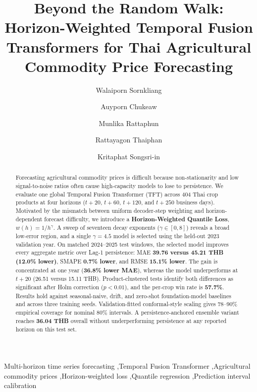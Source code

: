 \documentclass[review,3p,times]{elsarticle}
\begin{document}
\begin{frontmatter}
\title{Beyond the Random Walk: Horizon-Weighted Temporal Fusion Transformers for Thai Agricultural Commodity Price Forecasting}
\author[a]{Walaiporn Sornkliang}
\author[a]{Auyporn Chukeaw}
\author[a]{Munlika Rattaphun}
\author[a]{Rattayagon Thaiphan}
\author[a]{Kritaphat Songsri-in}
\begin{abstract}
Forecasting agricultural commodity prices is difficult because non-stationarity and low signal-to-noise ratios often cause high-capacity models to lose to persistence. We evaluate one global Temporal Fusion Transformer (TFT) across 404 Thai crop products at four horizons ($t+20$, $t+60$, $t+120$, and $t+250$ business days). Motivated by the mismatch between uniform decoder-step weighting and horizon-dependent forecast difficulty, we introduce a \textbf{Horizon-Weighted Quantile Loss}, $w(h)=1/h^\gamma$. A sweep of seventeen decay exponents ($\gamma \in [0,8]$) reveals a broad low-error region, and a single $\gamma=4.5$ model is selected using the held-out 2023 validation year. On matched 2024--2025 test windows, the selected model improves every aggregate metric over Lag-1 persistence: MAE \textbf{39.76 versus 45.21 THB (12.0\% lower)}, SMAPE \textbf{0.7\% lower}, and RMSE \textbf{15.1\% lower}. The gain is concentrated at one year (\textbf{36.8\% lower MAE}), whereas the model underperforms at $t+20$ (26.51 versus 15.11 THB). Product-clustered tests identify both differences as significant after Holm correction ($p<0.01$), and the per-crop win rate is \textbf{57.7\%}. Results hold against seasonal-naive, drift, and zero-shot foundation-model baselines and across three training seeds. Validation-fitted conformal-style scaling gives 78--90\% empirical coverage for nominal 80\% intervals. A persistence-anchored ensemble variant reaches \textbf{36.04 THB} overall without underperforming persistence at any reported horizon on this test set.

\end{abstract}
\begin{keyword}
Multi-horizon time series forecasting \sep Temporal Fusion Transformer \sep Agricultural commodity prices \sep Horizon-weighted loss \sep Quantile regression \sep Prediction interval calibration
\end{keyword}
\end{frontmatter}
\end{document}
